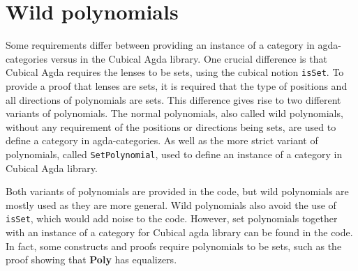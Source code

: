 \section{Wild polynomials}
Some requirements differ between providing an instance of a category in agda-categories versus in the Cubical Agda library.
One crucial difference is that Cubical Agda requires the lenses to be sets, using the cubical notion \texttt{isSet}. To provide a proof that lenses are sets, it is required that the type of positions and all directions of polynomials are sets. This difference gives rise to two different variants of polynomials. The normal polynomials, also called wild polynomials, without any requirement of the positions or directions being sets, are used to define a category in agda-categories. As well as the more strict variant of polynomials, called \texttt{SetPolynomial}, used to define an instance of a category in Cubical Agda library. 

Both variants of polynomials are provided in the code, but wild polynomials are mostly used as they are more general. Wild polynomials also avoid the use of \texttt{isSet}, which would add noise to the code. However, set polynomials together with an instance of a category for Cubical agda library can be found in the code. In fact, some constructs and proofs require polynomials to be sets, such as the proof showing that \textbf{Poly} has equalizers.




